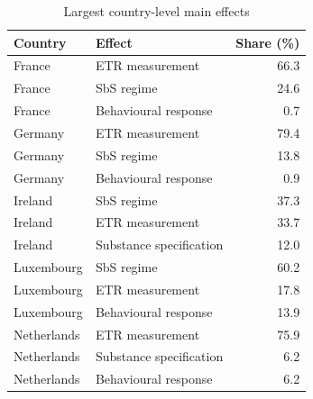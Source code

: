 \begin{table}[H]
\centering
\footnotesize
\setlength{\tabcolsep}{3pt}
\caption{Largest country-level main effects}
\label{tab:app_stage46_country_anova}
\begin{tabular}{@{}llr@{}}
\toprule
Country & Effect & Share (\%) \\
\midrule
France & ETR measurement & 66.3 \\
France & SbS regime & 24.6 \\
France & Behavioural response &  0.7 \\
Germany & ETR measurement & 79.4 \\
Germany & SbS regime & 13.8 \\
Germany & Behavioural response &  0.9 \\
Ireland & SbS regime & 37.3 \\
Ireland & ETR measurement & 33.7 \\
Ireland & Substance specification & 12.0 \\
Luxembourg & SbS regime & 60.2 \\
Luxembourg & ETR measurement & 17.8 \\
Luxembourg & Behavioural response & 13.9 \\
Netherlands & ETR measurement & 75.9 \\
Netherlands & Substance specification &  6.2 \\
Netherlands & Behavioural response &  6.2 \\
\bottomrule
\end{tabular}
\end{table}
